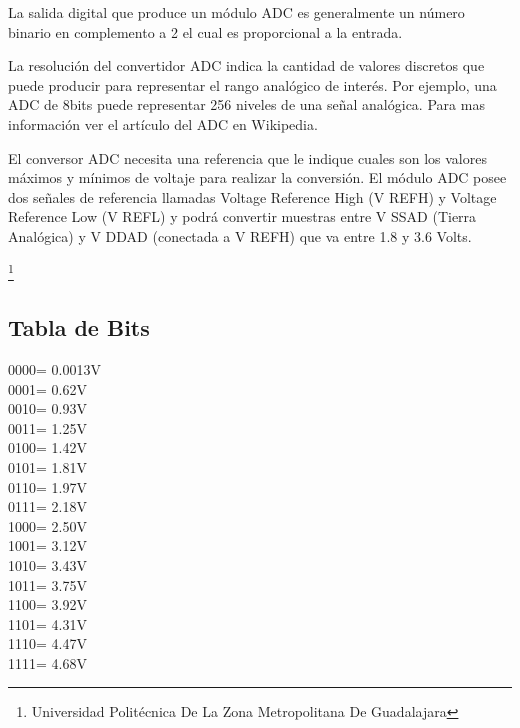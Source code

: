 \documentclass[10pt,a4paper]{article}
\begin{document}
La salida digital que produce un módulo ADC es generalmente un número binario en complemento a 2 el cual es proporcional a la entrada.

La resolución del convertidor ADC indica la cantidad de valores discretos que puede producir para representar el rango analógico de interés. Por ejemplo, una ADC de 8bits puede representar 256 niveles de una señal analógica. Para mas información ver el artículo del ADC en Wikipedia.

El conversor ADC necesita una referencia que le indique cuales son los valores máximos y mínimos de voltaje para realizar la conversión. El módulo ADC posee dos señales de referencia llamadas Voltage Reference High (V REFH) y Voltage Reference Low (V REFL) y podrá convertir muestras entre V SSAD (Tierra Analógica) y V DDAD (conectada a V REFH) que va entre 1.8 y 3.6 Volts. 

\footnote{Universidad Politécnica De La Zona Metropolitana De Guadalajara} 

\newpage

\subsection{Tabla de Bits}
0000= 0.0013V\\
0001= 0.62V\\
0010= 0.93V\\
0011= 1.25V\\
0100= 1.42V\\
0101= 1.81V\\
0110= 1.97V\\
0111= 2.18V\\
1000= 2.50V\\
1001= 3.12V\\
1010= 3.43V\\
1011= 3.75V\\
1100= 3.92V\\
1101= 4.31V\\
1110= 4.47V\\
1111= 4.68V
\end{document}
